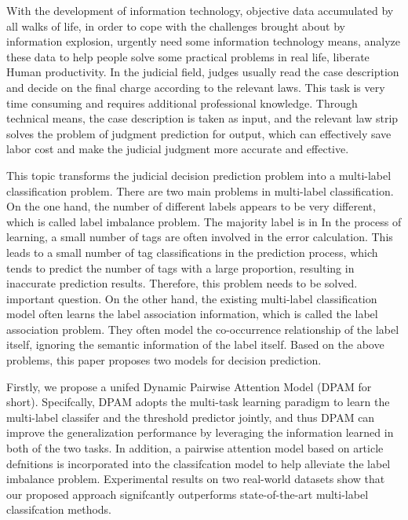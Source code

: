 \begin{eabstract}
With the development of information technology, objective data accumulated by all walks of life, in order to cope with the challenges brought about by information explosion, urgently need some information technology means, analyze these data to help people solve some practical problems in real life, liberate Human productivity. In the judicial field, judges usually read the case description and decide on the final charge according to the relevant laws. This task is very time consuming and requires additional professional knowledge. Through technical means, the case description is taken as input, and the relevant law strip solves the problem of judgment prediction for output, which can effectively save labor cost and make the judicial judgment more accurate and effective.

This topic transforms the judicial decision prediction problem into a multi-label classification problem. There are two main problems in multi-label classification. On the one hand, the number of different labels appears to be very different, which is called label imbalance problem. The majority label is in In the process of learning, a small number of tags are often involved in the error calculation. This leads to a small number of tag classifications in the prediction process, which tends to predict the number of tags with a large proportion, resulting in inaccurate prediction results. Therefore, this problem needs to be solved. important question. On the other hand, the existing multi-label classification model often learns the label association information, which is called the label association problem. They often model the co-occurrence relationship of the label itself, ignoring the semantic information of the label itself. Based on the above problems, this paper proposes two models for decision prediction.

Firstly, we propose a unifed Dynamic Pairwise Attention Model (DPAM for short). Specifcally, DPAM adopts the multi-task learning paradigm to learn the multi-label classifer and the threshold predictor jointly, and thus DPAM can improve the generalization performance by leveraging the information learned in both of the two tasks. In addition, a pairwise attention model based on article defnitions is incorporated into the classifcation model to help alleviate the label imbalance problem. Experimental results on two real-world datasets show that our proposed approach signifcantly outperforms state-of-the-art multi-label classifcation methods.


\end{eabstract}
